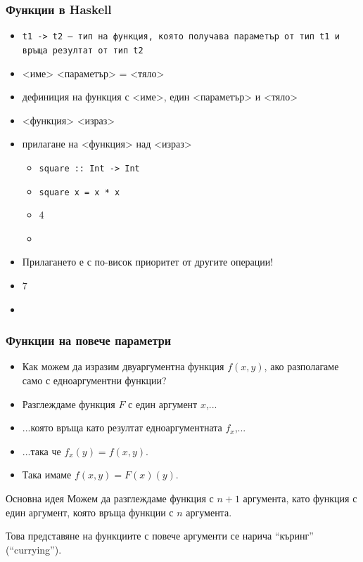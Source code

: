 \documentclass{beamer}
\begin{document}
\begin{frame}
  \frametitle{Функции в Haskell}

  \begin{itemize}[<+->]
  \item \tt{t1 -> t2} --- тип на функция, която получава параметър от тип \tt{t1} и връща резултат от тип \tt{t2}
  \item {}<име> <параметър> \tta= <тяло>
  \item дефиниция на функция с <име>, един <параметър> и <тяло>
  \item {}<функция> <израз>
  \item прилагане на <функция> над <израз>
    \begin{itemize}[<.->]
    \item \tt{square :: Int -> Int}
    \item \tt{square x = x * x}
    \item {}4
    \item {}
    \end{itemize}
  \item \alert{Прилагането е с по-висок приоритет от другите операции!}
  \item {}7
  \item {}
  \end{itemize}
\end{frame}

\begin{frame}
  \frametitle{Функции на повече параметри}
  \begin{itemize}[<+->]
  \item Как можем да изразим двуаргументна функция $f(x,y)$, ако разполагаме само с едноаргументни функции?
  \item Разглеждаме функция $F$ с един аргумент $x$,...
  \item ...която връща като резултат едноаргументната $f_x$,...
  \item ...така че $f_x(y) = f(x,y)$.
  \item Така имаме $f(x,y) = F(x)(y)$.
  \end{itemize}
  \onslide<+->
  \begin{block}{Основна идея}
    Можем да разглеждаме функция с $n+1$ аргумента, като функция с един аргумент, която връща функции с $n$ аргумента.
  \end{block}
  \onslide<+->
  \alert{Това представяне на функциите с повече аргументи се нарича ``къринг'' (``currying'').}
\end{frame}
\end{document}
